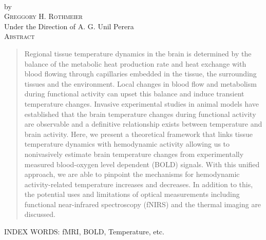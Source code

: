 \thispagestyle{empty}
\begin{center}
  { \huge \thesisTitle } \\
  \vspace{0.5in}
  by \\
  \vspace{0.5in}
  { \large \textsc{Greggory H. Rothmeier} } \\
  \vspace{0.5in}
  Under the Direction of A. G. Unil Perera\\
  \vspace{0.5in}
  \textsc{Abstract}
  \vspace{0.2in}
\end{center}
  \begin{quote}
  \footnotesize
    Regional tissue temperature dynamics in the brain is determined by the balance of the metabolic heat production rate and heat exchange with blood flowing through capillaries embedded in the tissue, the surrounding tissues and the environment. Local changes in blood flow and metabolism during functional activity can upset this balance and induce transient temperature changes. Invasive experimental studies in animal models have established that the brain temperature changes during functional activity are observable and a definitive relationship exists between temperature and brain activity. Here, we present a theoretical framework that links tissue temperature dynamics with hemodynamic activity allowing us to nonivasively estimate brain temperature changes from experimentally measured blood-oxygen level dependent (BOLD) signals. With this unified approach, we are able to pinpoint the mechanisms for hemodynamic activity-related temperature increases and decreases.  In addition to this, the potential uses and limitations of optical measurements including functional near-infrared spectroscopy (fNIRS) and the thermal imaging are discussed.  
  \end{quote}
\vspace*{\fill}
\footnotesize
INDEX WORDS: fMRI, BOLD, Temperature, etc.